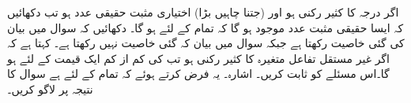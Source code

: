 \quad
اگر  درجہ  کا کثیر رکنی ہو اور  (جتنا چاہیں بڑا) اختیاری مثبت حقیقی عدد ہو تب دکھائیں کہ ایسا حقیقی مثبت عدد  موجود ہو گا کہ تمام  کے لئے  ہو گا۔
\quad
دکھائیں کہ  سوال  میں بیان کی گئی خاصیت رکھتا ہے جبکہ سوال  میں بیان کہ گئی خاصیت نہیں رکھتا ہے۔
\quad
{} کہتا ہے کہ  اگر غیر مستقل تفاعل  متغیرہ  کا کثیر رکنی ہو تب  کی  کم از کم ایک قیمت کے لئے  ہو گا۔اس مسئلے کو ثابت کریں۔ اشارہ۔ یہ فرض کرتے ہوئے  کہ تمام  کے لئے   ہے سوال   کا نتیجہ  پر لاگو کریں۔
